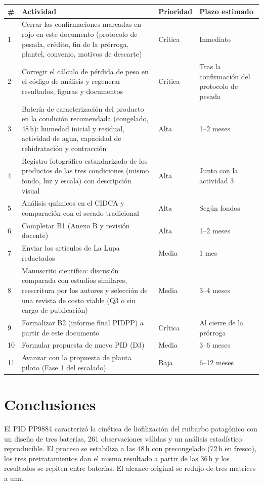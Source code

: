 \documentclass[12pt, a4paper]{article}
\begin{document}
\begin{longtable}{p{0.5cm}p{7cm}p{1.8cm}p{4cm}}
\toprule
\textbf{\#} & \textbf{Actividad} & \textbf{Prioridad} & \textbf{Plazo estimado} \\
\midrule
1 & Cerrar las confirmaciones marcadas en rojo en este documento (protocolo de pesada, crédito, fin de la prórroga, plantel, convenio, motivos de descarte) & Crítica & Inmediato \\
2 & Corregir el cálculo de pérdida de peso en el código de análisis y regenerar resultados, figuras y documentos & Crítica & Tras la confirmación del protocolo de pesada \\
3 & Batería de caracterización del producto en la condición recomendada (congelado, 48\,h): humedad inicial y residual, actividad de agua, capacidad de rehidratación y contracción & Alta & 1--2 meses \\
4 & Registro fotográfico estandarizado de los productos de las tres condiciones (mismo fondo, luz y escala) con descripción visual & Alta & Junto con la actividad 3 \\
5 & Análisis químicos en el CIDCA y comparación con el secado tradicional & Alta & Según fondos \\
6 & Completar B1 (Anexo B y revisión docente) & Alta & 1--2 meses \\
7 & Enviar los artículos de La Lupa redactados & Media & 1 mes \\
8 & Manuscrito científico: discusión comparada con estudios similares, reescritura por los autores y selección de una revista de costo viable (Q3 o sin cargo de publicación) & Media & 3--4 meses \\
9 & Formalizar B2 (informe final PIDPP) a partir de este documento & Crítica & Al cierre de la prórroga \\
10 & Formular propuesta de nuevo PID (D3) & Media & 3--6 meses \\
11 & Avanzar con la propuesta de planta piloto (Fase 1 del escalado) & Baja & 6--12 meses \\
\bottomrule
\end{longtable}

\section{Conclusiones}

El PID PP9884 caracterizó la cinética de liofilización del ruibarbo patagónico con un diseño de tres baterías, 261 observaciones válidas y un análisis estadístico reproducible. El proceso se estabiliza a las 48\,h con precongelado (72\,h en fresco), los tres pretratamientos dan el mismo resultado a partir de las 36\,h y los resultados se repiten entre baterías. El alcance original se redujo de tres matrices a una.
\end{document}
